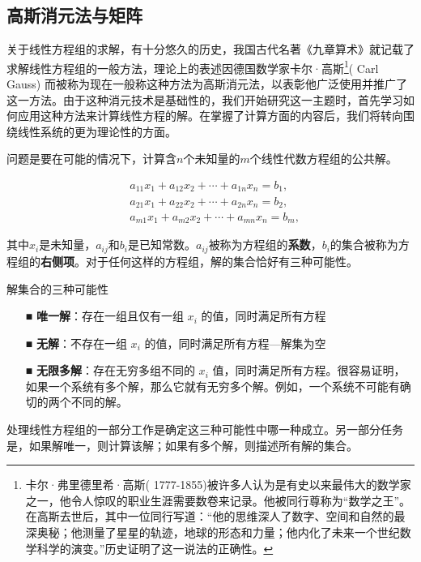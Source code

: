 \subsection{高斯消元法与矩阵}

关于线性方程组的求解，有十分悠久的历史，我国古代名著《九章算术》就记载了求解线性方程组的一般方法，理论上的表述因德国数学家卡尔·高斯\footnote{卡尔·弗里德里希·高斯( 1777-1855)被许多人认为是有史以来最伟大的数学家之一，他令人惊叹的职业生涯需要数卷来记录。他被同行尊称为“数学之王”。在高斯去世后，其中一位同行写道：“他的思维深人了数字、空间和自然的最深奥秘；他测量了星星的轨迹，地球的形态和力量；他内化了未来一个世纪数学科学的演变。”历史证明了这一说法的正确性。}( Carl Gauss) 而被称为现在一般称这种方法为高斯消元法，以表彰他广泛使用并推广了这一方法。由于这种消元技术是基础性的，我们开始研究这一主题时，首先学习如何应用这种方法来计算线性方程的解。在掌握了计算方面的内容后，我们将转向围绕线性系统的更为理论性的方面。

问题是要在可能的情况下，计算含\( n \)个未知量的\( m \)个线性代数方程组的公共解。

\[\begin{aligned}&a_{11}x_1+a_{12}x_2+\cdots+a_{1n}x_n=b_1,\\&a_{21}x_1+a_{22}x_2+\cdots+a_{2n}x_n=b_2,\\&a_{m1}x_1+a_{m2}x_2+\cdots+a_{mn}x_n=b_m,\end{aligned}\]

其中\( x_i \)是未知量，\( a_{ij} \)和\( b_i \)是已知常数。\( a_{ij} \)被称为方程组的\textbf{系数}，\( b_i\)的集合被称为方程组的\textbf{右侧项}。对于任何这样的方程组，解的集合恰好有三种可能性。

\begin{bluebox}{解集合的三种可能性}
	\begin{itemize}[leftmargin=*, labelsep=0.5em, itemsep=0.5em, topsep=0.5em]
		\item[■] \textbf{唯一解}：存在一组且仅有一组 $x_{i}$ 的值，同时满足所有方程
		\item[■] \textbf{无解}：不存在一组 $x_{i}$ 的值，同时满足所有方程—解集为空
		\item[■] \textbf{无限多解}：存在无穷多组不同的 $x_{i}$ 值，同时满足所有方程。很容易证明，如果一个系统有多个解，那么它就有无穷多个解。例如，一个系统不可能有确切的两个不同的解。
	\end{itemize}
\end{bluebox}

处理线性方程组的一部分工作是确定这三种可能性中哪一种成立。另一部分任务是，如果解唯一，则计算该解；如果有多个解，则描述所有解的集合。

